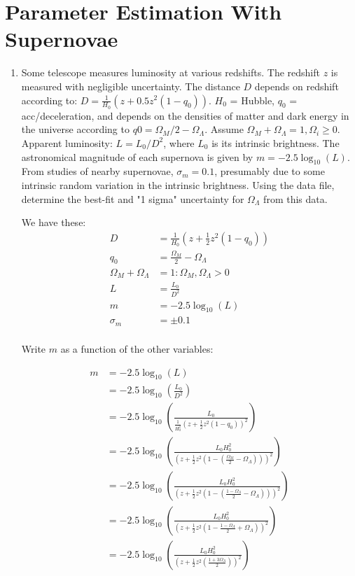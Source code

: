 \section{Parameter Estimation With Supernovae}

\begin{enumerate}[label=\textbf{\Alph*}.]
    \item Some telescope measures luminosity at various redshifts.
    The redshift $z$ is measured with negligible uncertainty.
    The distance $D$ depends on redshift according to: $D = \frac{1}{H_0}(z + 0.5z^2(1-q_0))$.
    $H_0$ = Hubble, $q_0$ = acc/deceleration, and depends on the densities of matter and dark energy in the universe according to $q0 = \Omega_M/2 - \Omega_\Lambda$.
    Assume $\Omega_M + \Omega_\Lambda = 1, \Omega_i \ge 0$.
    Apparent luminosity: $L=L_0/D^2$, where $L_0$ is its intrinsic brightness.
    The astronomical magnitude of each supernova is given by $m = -2.5\log_{10}(L)$.
    From studies of nearby supernovae, $\sigma_m = 0.1$, presumably due to some intrinsic random variation in the intrinsic brightness.
    Using the data file, determine the best-fit and "1 sigma" uncertainty for $\Omega_\Lambda$ from this data.

    We have these:
    \begin{align*}
        D &= \frac{1}{H_0} \left(z + \frac{1}{2}z^2 (1-q_0)\right)\\
        q_0 &= \frac{\Omega_M}{2} - \Omega_\Lambda\\
        \Omega_M + \Omega_\Lambda &= 1: \Omega_M, \Omega_\Lambda > 0\\
        L &= \frac{L_0}{D^2}\\
        m &= -2.5\log_{10}(L)\\
        \sigma_m &= \pm 0.1 \\
    \end{align*}

    Write $m$ as a function of the other variables:

    \begin{align*}
        m &= -2.5\log_{10}(L)\\
        &= -2.5\log_{10}\left(\frac{L_0}{D^2}\right)\\
        &= -2.5\log_{10}\left(\frac{L_0}{\frac{1}{H_0^2} \left(z + \frac{1}{2}z^2 (1-q_0)\right)^2}\right)\\
        &= -2.5\log_{10}\left(\frac{L_0H_0^2}{\left(z + \frac{1}{2}z^2 \left(1-\left(\frac{\Omega_M}{2} - \Omega_\Lambda\right)\right)\right)^2}\right)\\
        &= -2.5\log_{10}\left(\frac{L_0H_0^2}{\left(z + \frac{1}{2}z^2 \left(1-\left(\frac{1 - \Omega_\Lambda}{2} - \Omega_\Lambda\right)\right)\right)^2}\right)\\
        &= -2.5\log_{10}\left(\frac{L_0H_0^2}{\left(z + \frac{1}{2}z^2 \left(1-\frac{1 - \Omega_\Lambda}{2} + \Omega_\Lambda\right)\right)^2}\right)\\
        &= -2.5\log_{10}\left(\frac{L_0H_0^2}{\left(z + \frac{1}{2}z^2 \left(\frac{1 + 3\Omega_\Lambda}{2}\right)\right)^2}\right)\\
    \end{align*}


\end{enumerate}
